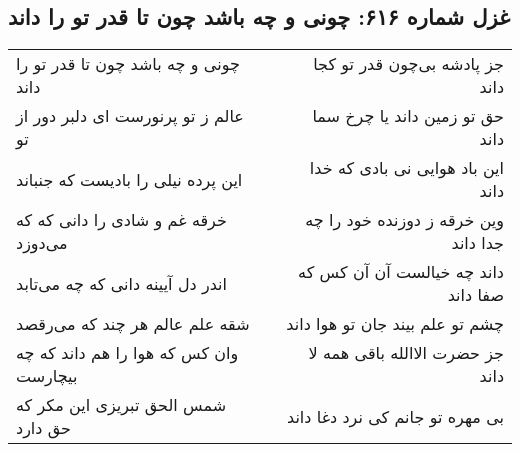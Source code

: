 \begin{center}
\section*{غزل شماره ۶۱۶: چونی و چه باشد چون تا قدر تو را داند}
\label{sec:0616}
\begin{longtable}{l p{0.5cm} r}
چونی و چه باشد چون تا قدر تو را داند
&&
جز پادشه بی‌چون قدر تو کجا داند
\\
عالم ز تو پرنورست ای دلبر دور از تو
&&
حق تو زمین داند یا چرخ سما داند
\\
این پرده نیلی را بادیست که جنباند
&&
این باد هوایی نی بادی که خدا داند
\\
خرقه غم و شادی را دانی که که می‌دوزد
&&
وین خرقه ز دوزنده خود را چه جدا داند
\\
اندر دل آیینه دانی که چه می‌تابد
&&
داند چه خیالست آن آن کس که صفا داند
\\
شقه علم عالم هر چند که می‌رقصد
&&
چشم تو علم بیند جان تو هوا داند
\\
وان کس که هوا را هم داند که چه بیچارست
&&
جز حضرت الاالله باقی همه لا داند
\\
شمس الحق تبریزی این مکر که حق دارد
&&
بی مهره تو جانم کی نرد دغا داند
\\
\end{longtable}
\end{center}
